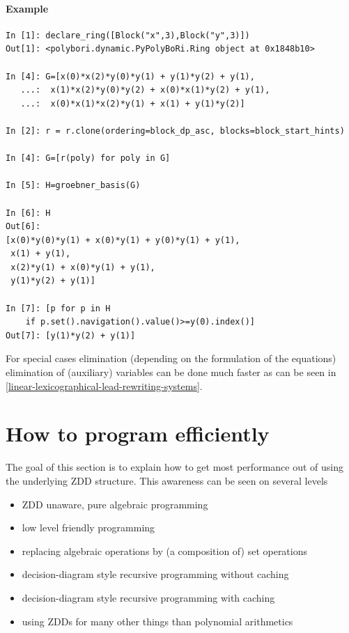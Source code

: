 \paragraph{Example} %
\label{par:example-elimination}
\begin{lstlisting}
In [1]: declare_ring([Block("x",3),Block("y",3)])
Out[1]: <polybori.dynamic.PyPolyBoRi.Ring object at 0x1848b10>

In [4]: G=[x(0)*x(2)*y(0)*y(1) + y(1)*y(2) + y(1),
   ...:  x(1)*x(2)*y(0)*y(2) + x(0)*x(1)*y(2) + y(1),
   ...:  x(0)*x(1)*x(2)*y(1) + x(1) + y(1)*y(2)]

In [2]: r = r.clone(ordering=block_dp_asc, blocks=block_start_hints)

In [4]: G=[r(poly) for poly in G]

In [5]: H=groebner_basis(G)

In [6]: H
Out[6]: 
[x(0)*y(0)*y(1) + x(0)*y(1) + y(0)*y(1) + y(1),
 x(1) + y(1),
 x(2)*y(1) + x(0)*y(1) + y(1),
 y(1)*y(2) + y(1)]

In [7]: [p for p in H 
    if p.set().navigation().value()>=y(0).index()]
Out[7]: [y(1)*y(2) + y(1)]
\end{lstlisting}

For special cases elimination (depending on the formulation of the equations) elimination of (auxiliary) variables can be done much faster as can be seen in \ref{linear-lexicographical-lead-rewriting-systems}.



\section{How to program ef{}f{}iciently}
\label{sec:program-efficiently}
The goal of this section is to explain how to get most performance out of \PolyBoRi using the underlying ZDD structure.
This awareness can be seen on several levels
\begin{itemize}
    \item ZDD unaware, pure algebraic programming 
    \item low level friendly programming
    \item replacing algebraic operations by (a composition of) set operations
    \item decision-diagram style recursive programming without caching
    \item decision-diagram style recursive programming with caching
    \item using ZDDs for many other things than polynomial arithmetics
\end{itemize}
